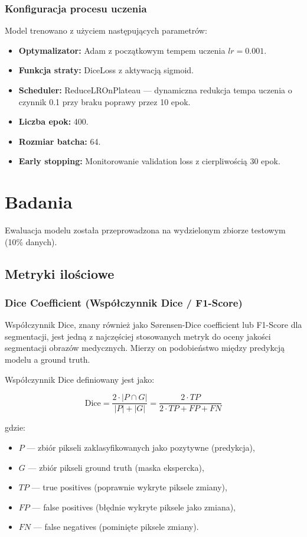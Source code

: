 \documentclass[12pt,a4paper]{article}
\begin{document}
\subsubsection{Konfiguracja procesu uczenia}
Model trenowano z użyciem następujących parametrów:
\begin{itemize}
    \item \textbf{Optymalizator:} Adam z początkowym tempem uczenia $lr=0.001$.
    \item \textbf{Funkcja straty:} DiceLoss z aktywacją sigmoid.
    \item \textbf{Scheduler:} ReduceLROnPlateau — dynamiczna redukcja tempa uczenia o czynnik 0.1 przy braku poprawy przez 10 epok.
    \item \textbf{Liczba epok:} 400.
    \item \textbf{Rozmiar batcha:} 64.
    \item \textbf{Early stopping:} Monitorowanie validation loss z cierpliwością 30 epok.
\end{itemize}

\newpage

\section{Badania}
Ewaluacja modelu została przeprowadzona na wydzielonym zbiorze testowym (10\% danych).

\subsection{Metryki ilościowe}

\subsubsection{Dice Coefficient (Współczynnik Dice / F1-Score)}
Współczynnik Dice, znany również jako Sørensen-Dice coefficient lub F1-Score dla segmentacji, jest jedną z najczęściej stosowanych metryk do oceny jakości segmentacji obrazów medycznych. Mierzy on podobieństwo między predykcją modelu a ground truth.

Współczynnik Dice definiowany jest jako:

\begin{equation}
\text{Dice} = \frac{2 \cdot |P \cap G|}{|P| + |G|} = \frac{2 \cdot TP}{2 \cdot TP + FP + FN}
\end{equation}

gdzie:
\begin{itemize}
    \item $P$ — zbiór pikseli zaklasyfikowanych jako pozytywne (predykcja),
    \item $G$ — zbiór pikseli ground truth (maska ekspercka),
    \item $TP$ — true positives (poprawnie wykryte piksele zmiany),
    \item $FP$ — false positives (błędnie wykryte piksele jako zmiana),
    \item $FN$ — false negatives (pominięte piksele zmiany).
\end{itemize}
\end{document}
